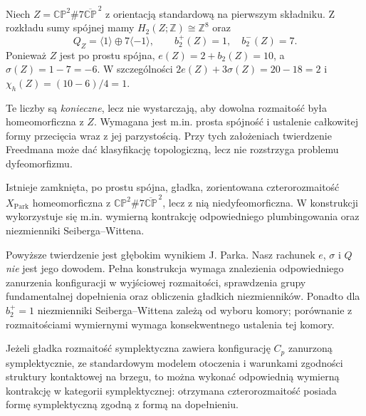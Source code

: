 \begin{przyklad}
Niech $Z=\mathbb{CP}^2\#7\overline{\mathbb{CP}}^{\,2}$
z orientacją standardową na pierwszym składniku.
Z rozkładu sumy spójnej mamy
$H_2(Z;\mathbb Z)\cong\mathbb Z^8$ oraz
\[
Q_Z=\langle1\rangle\oplus7\langle-1\rangle,
\qquad b_2^+(Z)=1,\quad b_2^-(Z)=7.
\]
Ponieważ $Z$ jest po prostu spójna,
$e(Z)=2+b_2(Z)=10$, a
$\sigma(Z)=1-7=-6$. W szczególności
$2e(Z)+3\sigma(Z)=20-18=2$ i
$\chi_h(Z)=(10-6)/4=1$.

Te liczby są \emph{konieczne}, lecz nie wystarczają,
aby dowolna rozmaitość była homeomorficzna z $Z$.
Wymagana jest m.in. prosta spójność i ustalenie
całkowitej formy przecięcia wraz z jej parzystością.
Przy tych założeniach twierdzenie Freedmana
może dać klasyfikację topologiczną, lecz nie
rozstrzyga problemu dyfeomorfizmu.
\end{przyklad}

\begin{twierdzenie}
Istnieje zamknięta, po prostu spójna, gładka,
zorientowana czterorozmaitość $X_{\mathrm{Park}}$
homeomorficzna z
$\mathbb{CP}^2\#7\overline{\mathbb{CP}}^{\,2}$,
lecz z nią niedyfeomorficzna. W konstrukcji
wykorzystuje się m.in. wymierną kontrakcję
odpowiedniego plumbingowania oraz niezmienniki
Seiberga--Wittena.
\end{twierdzenie}

\begin{uwaga}
Powyższe twierdzenie jest głębokim wynikiem J. Parka.
Nasz rachunek $e$, $\sigma$ i $Q$ \emph{nie} jest
jego dowodem. Pełna konstrukcja wymaga znalezienia
odpowiedniego zanurzenia konfiguracji w wyjściowej
rozmaitości, sprawdzenia grupy fundamentalnej
dopełnienia oraz obliczenia gładkich niezmienników.
Ponadto dla $b_2^+=1$ niezmienniki
Seiberga--Wittena zależą od wyboru komory;
porównanie z rozmaitościami wymiernymi wymaga
konsekwentnego ustalenia tej komory.
\end{uwaga}

\begin{twierdzenie}
Jeżeli gładka rozmaitość symplektyczna zawiera
konfigurację $C_p$ zanurzoną symplektycznie,
ze standardowym modelem otoczenia i warunkami
zgodności struktury kontaktowej na brzegu,
to można wykonać odpowiednią wymierną kontrakcję
w kategorii symplektycznej: otrzymana czterorozmaitość
posiada formę
symplektyczną zgodną z formą na dopełnieniu.
\end{twierdzenie}


